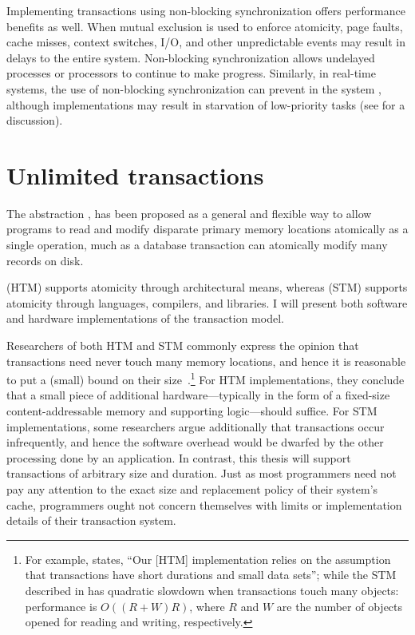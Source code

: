 Implementing transactions using
non-blocking synchronization offers performance benefits as well.
When mutual exclusion is used to enforce atomicity, page
faults, cache misses, context
switches, I/O, and other unpredictable events may result in delays to the
entire system. Non-blocking
synchronization allows undelayed processes or processors to continue
to make progress.
Similarly, in real-time systems, the use of non-blocking
synchronization can prevent 
 in the system
\cite{Jones97}, although \naive implementations may result in
starvation of low-priority tasks (see  for a discussion).

\section{Unlimited transactions}

The
 abstraction
\cite{Knight86,HerlihyMo93,StoneStHe93,RajwarGo02,ShavitTo95,HerlihyLuMoSc03},
has
been proposed as a general and flexible way to allow programs to read
and modify disparate primary memory locations atomically as a single
operation, much as a database transaction can atomically modify many
records on disk.

 (HTM) supports atomicity through
architectural means, whereas 
(STM) supports atomicity through languages, compilers, and libraries.
I will present both software and hardware implementations of the
transaction model.

Researchers of both HTM and STM commonly express the opinion that
transactions need never touch many memory locations, and hence it is
reasonable to put a (small) bound on their
size~\cite{HerlihyMo93,HerlihyLuMoSc03}.\footnote{%
For example, \cite[section 5.2]{HerlihyMo93} states,
``Our [HTM] implementation relies on the assumption that transactions have
short durations and small data sets''; while 
the STM described in \cite{HerlihyLuMoSc03} has quadratic slowdown when
transactions touch many objects: performance is $O((R+W)R)$, where $R$
and $W$ are the number of objects opened for reading and writing,
respectively.}
For HTM implementations,
they conclude that a small piece of additional hardware---typically in
the form of a fixed-size content-addressable memory and supporting
logic---should suffice.  For STM implementations, some researchers
argue additionally that transactions occur infrequently, and hence the
software overhead would be dwarfed by the other processing done by an
application.
In contrast, this thesis will support transactions of
arbitrary size and duration.  Just as most programmers need not pay any
attention to the exact size and replacement policy of their
system's cache, programmers ought not concern themselves with limits
or implementation details of their transaction system.

